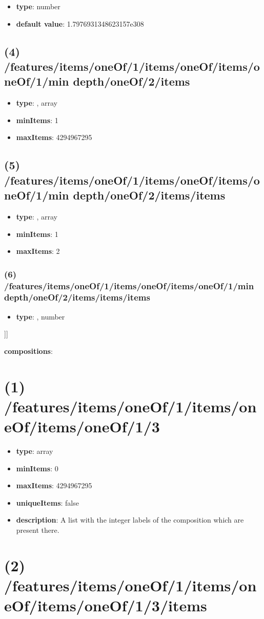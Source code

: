 \begin{itemize}[leftmargin=5em]\item {\bf type}: number\item {\bf default value}: 1.7976931348623157e308
\end{itemize}\subsection{(4) /features/items/oneOf/1/items/oneOf/items/oneOf/1/min depth/oneOf/2/items}
\begin{itemize}[leftmargin=4em]\item {\bf type}: , array\item {\bf minItems}: 1
\item {\bf maxItems}: 4294967295
\end{itemize}\subsection{(5) /features/items/oneOf/1/items/oneOf/items/oneOf/1/min depth/oneOf/2/items/items}
\begin{itemize}[leftmargin=5em]\item {\bf type}: , array\item {\bf minItems}: 1
\item {\bf maxItems}: 2
\end{itemize}\subsubsection{(6) /features/items/oneOf/1/items/oneOf/items/oneOf/1/min depth/oneOf/2/items/items/items}
\begin{itemize}[leftmargin=6em]\item {\bf type}: , number\end{itemize}]]\item {\bf compositions}: \section{(1) /features/items/oneOf/1/items/oneOf/items/oneOf/1/3}
\begin{itemize}[leftmargin=1em]\item {\bf type}: array
\item {\bf minItems}: 0
\item {\bf maxItems}: 4294967295
\item {\bf uniqueItems}: false
\item {\bf description}: A list with the integer labels of the composition which are present there.
\end{itemize}\section{(2) /features/items/oneOf/1/items/oneOf/items/oneOf/1/3/items}
